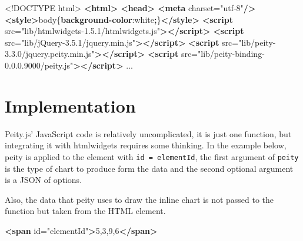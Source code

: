 \documentclass[
]{krantz}
\makeatletter
\newenvironment{Shaded}{\begin{snugshade}}{\end{snugshade}}
\newcommand{\AttributeTok}[1]{\textcolor[rgb]{0.61,0.61,0.61}{#1}}
\newcommand{\ConstantTok}[1]{\textcolor[rgb]{0,0,0}{#1}}
\newcommand{\DataTypeTok}[1]{\textcolor[rgb]{0.27,0.27,0.27}{#1}}
\newcommand{\KeywordTok}[1]{\textcolor[rgb]{0.27,0.27,0.27}{\textbf{#1}}}
\newcommand{\NormalTok}[1]{#1}
\newcommand{\OperatorTok}[1]{\textcolor[rgb]{0.43,0.43,0.43}{\textbf{#1}}}
\newcommand{\OtherTok}[1]{\textcolor[rgb]{0.37,0.37,0.37}{#1}}
\newcommand{\StringTok}[1]{\textcolor[rgb]{0.5,0.5,0.5}{#1}}
\newenvironment{kframe}{%
\medskip{}
\setlength{\fboxsep}{.8em}
 \def\at@end@of@kframe{}%
 \ifinner\ifhmode%
  \def\at@end@of@kframe{\end{minipage}}%
  \begin{minipage}{\columnwidth}%
 \fi\fi%
 \def\FrameCommand##1{\hskip\@totalleftmargin \hskip-\fboxsep
 \colorbox{shadecolor}{##1}\hskip-\fboxsep
     \hskip-\linewidth \hskip-\@totalleftmargin \hskip\columnwidth}%
 \MakeFramed {\advance\hsize-\width
   \@totalleftmargin\z@ \linewidth\hsize
   \@setminipage}}%
 {\par\unskip\endMakeFramed%
 \at@end@of@kframe}
\renewenvironment{Shaded}{\begin{kframe}}{\end{kframe}}
\makeatother
\begin{document}
\begin{Shaded}
\begin{Highlighting}[]
\DataTypeTok{<!DOCTYPE }\NormalTok{html}\DataTypeTok{>}
\KeywordTok{<html>}
\KeywordTok{<head>}
\KeywordTok{<meta}\OtherTok{ charset=}\StringTok{"utf{-}8"}\KeywordTok{/>}
\KeywordTok{<style>}\NormalTok{body\{}\KeywordTok{background{-}color}\NormalTok{:}\ConstantTok{white}\OperatorTok{;}\NormalTok{\}}\KeywordTok{</style>}
\KeywordTok{<script}\OtherTok{ src=}\StringTok{"lib/htmlwidgets{-}1.5.1/htmlwidgets.js"}\KeywordTok{></script>}
\KeywordTok{<script}\OtherTok{ src=}\StringTok{"lib/jQuery{-}3.5.1/jquery.min.js"}\KeywordTok{></script>}
\KeywordTok{<script}\OtherTok{ src=}\StringTok{"lib/peity{-}3.3.0/jquery.peity.min.js"}\KeywordTok{></script>}
\KeywordTok{<script}\OtherTok{ src=}\StringTok{"lib/peity{-}binding{-}0.0.0.9000/peity.js"}\KeywordTok{></script>}
\NormalTok{...}
\end{Highlighting}
\end{Shaded}

\hypertarget{widgets-realistic-implementation}{%
\section{Implementation}\label{widgets-realistic-implementation}}

Peity.js' JavaScript code is relatively uncomplicated, it is just one function, but integrating it with htmlwidgets requires some thinking. In the example below, peity is applied to the element with \texttt{id\ =\ \textquotesingle{}elementId\textquotesingle{}}, the first argument of \texttt{peity} is the type of chart to produce form the data and the second optional argument is a JSON of options.

\begin{Shaded}
\end{Shaded}

Also, the data that peity uses to draw the inline chart is not passed to the function but taken from the HTML element.

\begin{Shaded}
\begin{Highlighting}[]
\KeywordTok{<span}\OtherTok{ id=}\StringTok{"elementId"}\KeywordTok{>}\NormalTok{5,3,9,6}\KeywordTok{</span>}
\end{Highlighting}
\end{Shaded}
\end{document}
